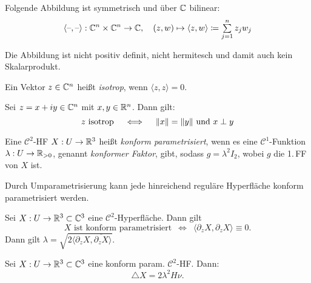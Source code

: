 \documentclass{cheat-sheet}
\newcommand{\Cont}{\mathcal{C}} %
\begin{document}
\begin{defn}
  Folgende Abbildung ist symmetrisch und über $\mathbb{C}$ bilinear:
  \[
    \langle \blank , \blank \rangle : \C^n \times \C^n \to \C, \quad
    (z, w) \mapsto \langle z, w \rangle \coloneqq \sum_{j=1}^n z_j w_j
  \]
\end{defn}

\begin{bem}
  Die Abbildung ist nicht positiv definit, nicht hermitesch und damit auch kein Skalarprodukt.
\end{bem}

\begin{defn}
  Ein Vektor $z \in \mathbb{C}^n$ heißt \emph{isotrop}, wenn $\langle z, z \rangle = 0$.
\end{defn}


\begin{lem}
  Sei $z = x + iy \in \mathbb{C}^n$ mit $x, y \in \mathbb{R}^n$. Dann gilt:
  \[ z \text{ isotrop} \quad \iff \quad \lVert x\rVert = \lVert y\rVert \text{ und } x \perp y \]
\end{lem}


\begin{defn}
  Eine $\Cont^2$-HF $X : U \to \mathbb{R}^3$ heißt \emph{konform parametrisiert}, wenn es eine $\Cont^1$-Funktion $\lambda : U \to \mathbb{R}_{>0}$, genannt \emph{konformer Faktor}, gibt, sodass $g = \lambda^2 I_2$, wobei $g$ die 1.\,FF von $X$ ist.
\end{defn}

\begin{bem}
  Durch Umparametrisierung kann jede hinreichend reguläre Hyperfläche konform parametrisiert werden.
\end{bem}

\begin{lem}
  Sei $X : U \to \mathbb{R}^3 \subset \mathbb{C}^3$ eine $\Cont^2$-Hyperfläche. Dann gilt
  \[
    \text{$X$ ist konform parametrisiert}
    \enspace \iff \enspace
    \langle \partial_z X, \partial_z X \rangle \equiv 0.
  \]
  Dann gilt $\lambda = \sqrt{2 \langle \partial_z X , \overline{\partial_z X} \rangle}$.
\end{lem}

\begin{lem}
  Sei $X : U \to \mathbb{R}^3 \subset \mathbb{C}^3$ eine konform param. $\Cont^2$-HF. Dann:
  \[ \triangle X = 2 \lambda^2 H \nu. \]
\end{lem}
\end{document}
